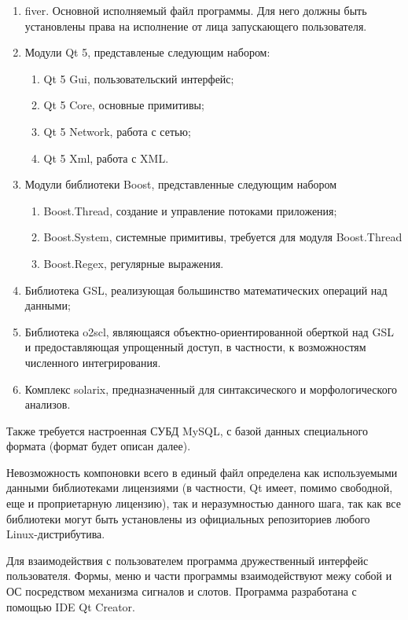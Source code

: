 \documentclass[a4paper,14pt,russian]{extreport}
\begin{document}
\begin{enumerate}
\item fiver. Основной исполняемый файл программы. Для него должны быть установлены права на исполнение от лица запускающего пользователя.
\item Модули Qt 5, представленые следующим набором:
\begin{enumerate}
\item Qt 5 Gui, пользовательский интерфейс;
\item Qt 5 Core, основные примитивы;
\item Qt 5 Network, работа с сетью;
\item Qt 5 Xml, работа с XML.
\end{enumerate}
\item Модули библиотеки Boost, представленные следующим набором
\begin{enumerate}
\item Boost.Thread, создание и управление потоками приложения;
\item Boost.System, системные примитивы, требуется для модуля Boost.Thread
\item Boost.Regex, регулярные выражения.
\end{enumerate}
\item Библиотека GSL, реализующая большинство математических операций над данными;
\item Библиотека o2scl, являющаяся объектно-ориентированной оберткой над GSL и предоставляющая упрощенный доступ, в частности, к возможностям численного интегрирования.
\item Комплекс solarix, предназначенный для синтаксического и морфологического анализов.
\end{enumerate}

Также требуется настроенная СУБД MySQL, с базой данных специального формата (формат будет описан далее).

Невозможность компоновки всего в единый файл определена как используемыми данными библиотеками лицензиями (в частности, Qt имеет, помимо свободной, еще и проприетарную лицензию), так и неразумностью данного шага, так как все библиотеки могут быть установлены из официальных репозиториев любого Linux-дистрибутива.

Для взаимодействия с пользователем программа дружественный интерфейс пользователя. Формы, меню и части программы взаимодействуют межу собой и ОС посредством механизма сигналов и слотов. Программа разработана с помощью IDE Qt Creator.
\end{document}
